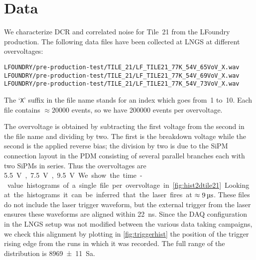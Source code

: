 \section{Data}

We characterize DCR and correlated noise for Tile~21 from the LFoundry
production. The following data files have been collected at LNGS at different
overvoltages:
%
\begin{verbatim}
LFOUNDRY/pre-production-test/TILE_21/LF_TILE21_77K_54V_65VoV_X.wav
LFOUNDRY/pre-production-test/TILE_21/LF_TILE21_77K_54V_69VoV_X.wav
LFOUNDRY/pre-production-test/TILE_21/LF_TILE21_77K_54V_73VoV_X.wav
\end{verbatim}
%
The `\texttt{X}' suffix in the file name stands for an index which goes from~1
to~10. Each file contains $\approx\num{20000}$ events, so we have \num{200000}
events per overvoltage.

The overvoltage is obtained by subtracting the first voltage from the second in
the file name and dividing by two. The first is the breakdown voltage while the
second is the applied reverse bias; the division by two is due to the SiPM
connection layout in the PDM consisting of several parallel branches each with
two SiPMs in series. Thus the overvoltages are \SI{5.5}V, \SI{7.5}V, \SI{9.5}V.

We show the time-value histograms of a single file per overvoltage in
\autoref{fig:hist2dtile21}. Looking at the histograms it can be inferred that
the laser fires at $\approx\SI9{\micro s}$. These files do not include the
laser trigger waveform, but the external trigger from the laser ensures these
waveforms are aligned within \SI{22}{ns}. Since the DAQ configuration in the
LNGS setup was not modified between the various data taking campaigns, we check
this alignment by plotting in \autoref{fig:triggerhist} the position of the
trigger rising edge from the runs in which it was recorded. The full range of
the distribution is \SI[separate-uncertainty=true]{8969 \pm 11}{Sa}.

\begin{figure}
    
    
    
\end{figure}

